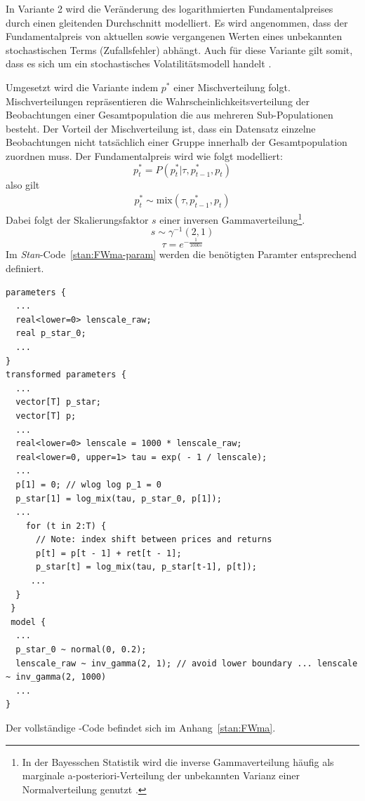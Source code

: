 \documentclass[ngerman]{ttlab-qualify}
\begin{document}
In Variante 2 wird die Veränderung des logarithmierten Fundamentalpreises durch einen gleitenden Durchschnitt modelliert. Es wird angenommen, dass der Fundamentalpreis von aktuellen sowie vergangenen Werten eines unbekannten stochastischen Terms (Zufallsfehler) abhängt. Auch für diese Variante gilt somit, dass es sich um ein stochastisches Volatilitätsmodell handelt \parencite{bertschinger:2018}. 

Umgesetzt wird die Variante indem $p^*$ einer Mischverteilung folgt. Mischverteilungen repräsentieren die Wahrscheinlichkeitsverteilung der Beobachtungen einer Gesamtpopulation die aus mehreren Sub-Populationen besteht. Der Vorteil der Mischverteilung ist, dass ein Datensatz einzelne Beobachtungen nicht tatsächlich einer Gruppe innerhalb der Gesamtpopulation zuordnen muss.
Der Fundamentalpreis wird wie folgt modelliert:
\[p_t^* = P(p_t^*|\tau,p_{t-1}^*,p_t)\]
also gilt
\begin{align}
p_t^*\sim\text{mix}(\tau,p_{t-1}^*,p_t)\nonumber
\end{align}
Dabei folgt der Skalierungsfaktor $s$ einer inversen Gammaverteilung\footnote{In der Bayesschen Statistik wird die inverse Gammaverteilung häufig als marginale a-posteriori-Verteilung der unbekannten Varianz einer Normalverteilung genutzt \parencite{inversgamma}.}.
\[s\sim \gamma^{-1}(2,1)\]
\[\tau =e^{-\frac{1}{1000 s}}\]
Im \textit{Stan}-Code~\ref{stan:FWma-param} werden die benötigten Paramter entsprechend definiert.

\begin{lstlisting}[style=custom, caption={Teil-Modell(Moving Average) nach \parencite{bertschinger:2018,FW:2011}},label={stan:FWma-param}]
parameters {
  ...
  real<lower=0> lenscale_raw;  
  real p_star_0;
  ...
}
transformed parameters {
  ...
  vector[T] p_star;
  vector[T] p;
  ...
  real<lower=0> lenscale = 1000 * lenscale_raw;
  real<lower=0, upper=1> tau = exp( - 1 / lenscale);
  ...
  p[1] = 0; // wlog log p_1 = 0
  p_star[1] = log_mix(tau, p_star_0, p[1]);
  ...
    for (t in 2:T) {
      // Note: index shift between prices and returns
      p[t] = p[t - 1] + ret[t - 1];
      p_star[t] = log_mix(tau, p_star[t-1], p[t]);
     ...
  }
 }
 model {
  ...
  p_star_0 ~ normal(0, 0.2);
  lenscale_raw ~ inv_gamma(2, 1); // avoid lower boundary ... lenscale ~ inv_gamma(2, 1000)
  ...
}
\end{lstlisting}

Der vollständige -Code befindet sich im Anhang~\ref{stan:FWma}.\\
\end{document}
